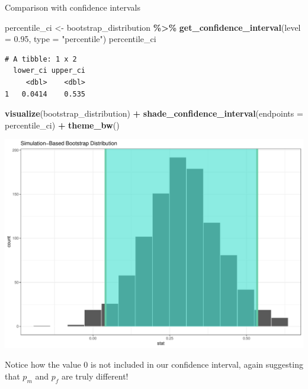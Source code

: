 \documentclass[
  ignorenonframetext,
]{beamer}
\newenvironment{Shaded}{\begin{snugshade}}{\end{snugshade}}
\newcommand{\AttributeTok}[1]{\textcolor[rgb]{0.13,0.29,0.53}{#1}}
\newcommand{\FloatTok}[1]{\textcolor[rgb]{0.00,0.00,0.81}{#1}}
\newcommand{\FunctionTok}[1]{\textcolor[rgb]{0.13,0.29,0.53}{\textbf{#1}}}
\newcommand{\NormalTok}[1]{#1}
\newcommand{\OtherTok}[1]{\textcolor[rgb]{0.56,0.35,0.01}{#1}}
\newcommand{\SpecialCharTok}[1]{\textcolor[rgb]{0.81,0.36,0.00}{\textbf{#1}}}
\newcommand{\StringTok}[1]{\textcolor[rgb]{0.31,0.60,0.02}{#1}}
\begin{document}
\begin{frame}[fragile]{Comparison with confidence intervals}
\protect\hypertarget{comparison-with-confidence-intervals-2}{}
\tiny

\begin{Shaded}
\begin{Highlighting}[]
\NormalTok{percentile\_ci }\OtherTok{\textless{}{-}}\NormalTok{ bootstrap\_distribution }\SpecialCharTok{\%\textgreater{}\%} 
  \FunctionTok{get\_confidence\_interval}\NormalTok{(}\AttributeTok{level =} \FloatTok{0.95}\NormalTok{, }\AttributeTok{type =} \StringTok{"percentile"}\NormalTok{)}
\NormalTok{percentile\_ci}
\end{Highlighting}
\end{Shaded}

\begin{verbatim}
# A tibble: 1 x 2
  lower_ci upper_ci
     <dbl>    <dbl>
1   0.0414    0.535
\end{verbatim}

\begin{Shaded}
\begin{Highlighting}[]
\FunctionTok{visualize}\NormalTok{(bootstrap\_distribution) }\SpecialCharTok{+} 
  \FunctionTok{shade\_confidence\_interval}\NormalTok{(}\AttributeTok{endpoints =}\NormalTok{ percentile\_ci) }\SpecialCharTok{+} 
  \FunctionTok{theme\_bw}\NormalTok{()}
\end{Highlighting}
\end{Shaded}

\begin{center}\includegraphics[width=0.7\linewidth,height=0.35\textheight]{Week11_12_13_files/figure-beamer/unnamed-chunk-59-1} \end{center}
\normalsize

Notice how the value 0 is not included in our confidence interval, again
suggesting that \(p_m\) and \(p_f\) are truly different!
\end{frame}
\end{document}
